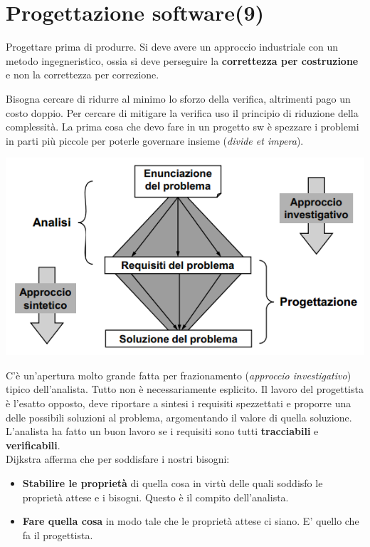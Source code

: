 



\section{Progettazione software(9)}

Progettare prima di produrre. Si deve avere un approccio industriale con un metodo ingegneristico, ossia si deve perseguire la \textbf{correttezza per costruzione} e non la correttezza per correzione.

Bisogna cercare di ridurre al minimo lo sforzo della verifica, altrimenti pago un costo doppio. Per cercare di mitigare la verifica uso il principio di riduzione della complessità. La prima cosa che devo fare in un progetto sw è spezzare i problemi in parti più piccole per poterle governare insieme (\textit{divide et impera}).

\includegraphics[width=0.5\columnwidth]{img1} %


C'è un'apertura molto grande fatta per frazionamento (\textit{approccio investigativo}) tipico dell'analista. Tutto non è necessariamente esplicito. Il lavoro del progettista è l'esatto opposto, deve riportare a sintesi i requisiti spezzettati e proporre una delle possibili soluzioni al problema, argomentando il valore di quella soluzione. L'analista ha fatto un buon lavoro se i requisiti sono tutti \textbf{tracciabili} e \textbf{verificabili}.\\
Dijkstra afferma che per soddisfare i nostri bisogni:

\begin{itemize}

	\item \textbf{Stabilire le proprietà} di quella cosa in virtù delle quali soddisfo le proprietà attese e i bisogni. Questo è il compito dell'analista.
	\item \textbf{Fare quella cosa} in modo tale che le proprietà attese ci siano. E' quello che fa il progettista.

\end{itemize}

